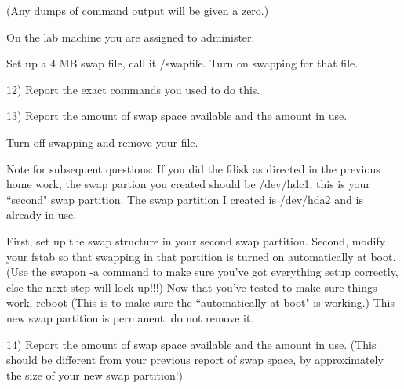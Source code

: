 (Any dumps of command output will be given a zero.)

On the lab machine you are assigned to administer:

Set up a 4 MB swap file, call it {\ltt{}/swapfile}.
Turn on swapping for that file.

12) Report the exact commands you used to do this.

13) Report the amount of swap space available and the amount in use.

Turn off swapping and remove your file.

Note for subsequent questions:
If you did the {\ltt{}fdisk} as directed in the previous home work,
the swap partion you created should be {\ltt{}/dev/hdc1}; this is your
``second" swap partition.
The swap partition I created is {\ltt{}/dev/hda2} and is already in use.

First, set up the swap structure in your second swap partition.
Second, modify your {\ltt{}fstab} so that swapping in that partition
is turned on automatically at boot.
(Use the {\ltt{}swapon -a} command to make sure you've got everything
setup correctly, else the next step will lock up!!!)
Now that you've tested to make sure things work, reboot
(This is to make sure the ``automatically at boot" is working.)
This new swap partition is permanent, do not remove it.

14) Report the amount of swap space available and the amount in use.
(This should be different from your previous report of swap space, by
approximately the size of your new swap partition!)

\bye
